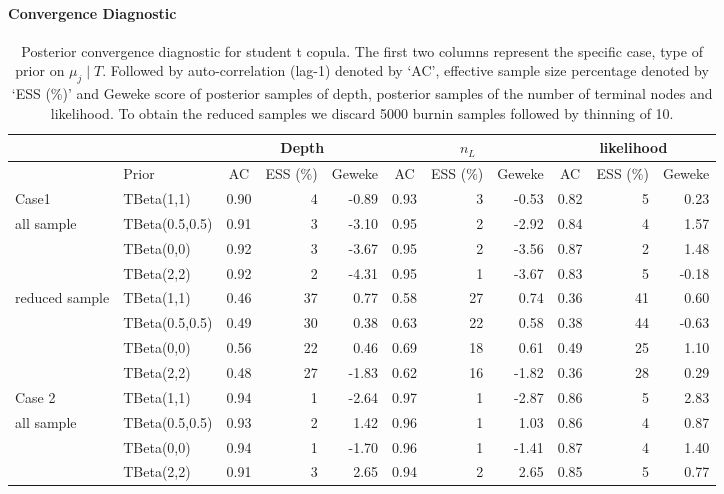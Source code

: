 \documentclass{amsart}
\begin{document}
\paragraph{Convergence Diagnostic}
\begin{table}[ht]
	\centering
	\caption{Posterior convergence diagnostic for student t copula. The first two columns represent the specific case, type of prior on $\mu_j\mid T$. Followed by auto-correlation (lag-1) denoted by `AC', effective sample size percentage denoted by `ESS (\%)' and Geweke score of posterior samples of depth, posterior samples of the number of terminal nodes and likelihood. To obtain the reduced samples we discard 5000 burnin samples followed by thinning of 10.}
	\scriptsize{
	\begin{tabular}{ll|crr|crr|crr}
		\toprule
		\multicolumn{2}{c|}{} &
		\multicolumn{3}{c|}{Depth} &
		\multicolumn{3}{c|}{$n_L$} &
		\multicolumn{3}{c}{likelihood} \\
		\midrule
		& Prior & AC & ESS (\%) & Geweke & AC & ESS (\%) & Geweke & AC & ESS (\%) & Geweke \\ 
		\midrule
		Case1 & TBeta(1,1) & 0.90 & 4 & -0.89 & 0.93 & 3 & -0.53 & 0.82 & 5 & 0.23 \\ 
		all sample & TBeta(0.5,0.5) & 0.91 & 3 & -3.10 & 0.95 & 2 & -2.92 & 0.84 & 4 & 1.57 \\ 
		& TBeta(0,0) & 0.92 & 3 & -3.67 & 0.95 & 2 & -3.56 & 0.87 & 2 & 1.48 \\ 
		& TBeta(2,2) & 0.92 & 2 & -4.31 & 0.95 & 1 & -3.67 & 0.83 & 5 & -0.18 \\ 
		\midrule
		reduced sample & TBeta(1,1) & 0.46 & 37 & 0.77 & 0.58 & 27 & 0.74 & 0.36 & 41 & 0.60 \\ 
		& TBeta(0.5,0.5) & 0.49 & 30 & 0.38 & 0.63 & 22 & 0.58 & 0.38 & 44 & -0.63 \\ 
		& TBeta(0,0) & 0.56 & 22 & 0.46 & 0.69 & 18 & 0.61 & 0.49 & 25 & 1.10 \\ 
		& TBeta(2,2) & 0.48 & 27 & -1.83 & 0.62 & 16 & -1.82 & 0.36 & 28 & 0.29 \\ 
		\midrule
		Case 2 & TBeta(1,1) & 0.94 & 1 & -2.64 & 0.97 & 1 & -2.87 & 0.86 & 5 & 2.83 \\ 
		all sample & TBeta(0.5,0.5) & 0.93 & 2 & 1.42 & 0.96 & 1 & 1.03 & 0.86 & 4 & 0.87 \\ 
		& TBeta(0,0) & 0.94 & 1 & -1.70 & 0.96 & 1 & -1.41 & 0.87 & 4 & 1.40 \\ 
		& TBeta(2,2) & 0.91 & 3 & 2.65 & 0.94 & 2 & 2.65 & 0.85 & 5 & 0.77 \\ 

\end{tabular}}
\end{table}
\end{document}
